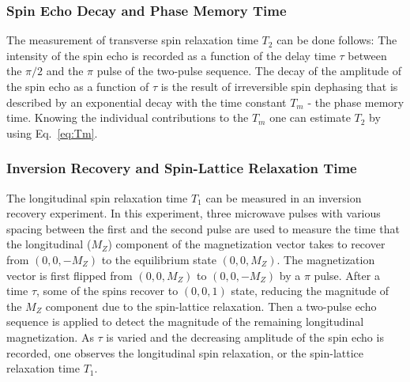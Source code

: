 \subsubsection{Spin Echo Decay and Phase Memory Time}
The measurement of transverse spin relaxation time $T_2$ can be done follows: The intensity of the spin echo is recorded as a function of the delay time $\tau$ between the $\pi/2$ and the $\pi$ pulse of the two-pulse sequence. The decay of the amplitude of the spin echo as a function of $\tau$ is the result of irreversible spin dephasing that is described by an exponential decay with the time constant $T_m$ - the phase memory time. Knowing the individual contributions to the $T_m$ one can estimate $T_2$ by using Eq.~\ref{eq:Tm}.

\subsubsection{Inversion Recovery and Spin-Lattice Relaxation Time}
The longitudinal spin relaxation time $T_1$ can be measured in an inversion recovery experiment. In this experiment, three microwave pulses with various spacing between the first and the second pulse are used to measure the time that the longitudinal ($M_Z$) component of the magnetization vector takes to recover from $(0,0,-M_Z)$ to the equilibrium state $(0,0,M_Z)$. The magnetization vector is first flipped from $(0,0,M_Z)$ to $(0,0,-M_Z)$ by a $\pi$ pulse. After a time $\tau$, some of the spins recover to $(0,0,1)$ state, reducing the magnitude of the $M_Z$ component due to the spin-lattice relaxation. Then a two-pulse echo sequence is applied to detect the magnitude of the remaining longitudinal magnetization. As $\tau$ is varied and the decreasing amplitude of the spin echo is recorded, one observes the longitudinal spin relaxation, or the spin-lattice relaxation time $T_1$.